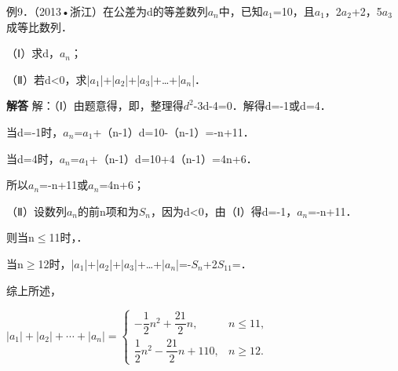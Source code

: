 例9．（2013•浙江）在公差为d的等差数列{\ensuremath{a_{n}}}中，已知\ensuremath{a_{1}}=10，且\ensuremath{a_{1}}，2\ensuremath{a_{2}}+2，5\ensuremath{a_{3}}成等比数列．\par
（Ⅰ）求d，\ensuremath{a_{n}}；\par
（Ⅱ）若d<0，求|\ensuremath{a_{1}}|+|\ensuremath{a_{2}}|+|\ensuremath{a_{3}}|+\ldots{}+|\ensuremath{a_{n}}|．\par
\QuestionSpace{4.8cm}
\ifshowanswers
\par\begingroup\color{solutioncolor}\noindent\textbf{解答}\quad
解：（Ⅰ）由题意得，即，整理得\ensuremath{d^{2}}-3d-4=0．解得d=-1或d=4．\par
当d=-1时，\ensuremath{a_{n}}=\ensuremath{a_{1}}+（n-1）d=10-（n-1）=-n+11．\par
当d=4时，\ensuremath{a_{n}}=\ensuremath{a_{1}}+（n-1）d=10+4（n-1）=4n+6．\par
所以\ensuremath{a_{n}}=-n+11或\ensuremath{a_{n}}=4n+6；\par
（Ⅱ）设数列{\ensuremath{a_{n}}}的前n项和为\ensuremath{S_{n}}，因为d<0，由（Ⅰ）得d=-1，\ensuremath{a_{n}}=-n+11．\par
则当n\ensuremath{\le}11时，．\par
当n\ensuremath{\ge}12时，|\ensuremath{a_{1}}|+|\ensuremath{a_{2}}|+|\ensuremath{a_{3}}|+\ldots{}+|\ensuremath{a_{n}}|=-\ensuremath{S_{n}}+2\ensuremath{S_{11}}=．\par
综上所述，\par
$|a_1|+|a_2|+\cdots+|a_n|=
\begin{cases}
-\dfrac12n^2+\dfrac{21}{2}n,&n\leq11,\\[3pt]
\dfrac12n^2-\dfrac{21}{2}n+110,&n\geq12.
\end{cases}$\par
\par\endgroup\fi

